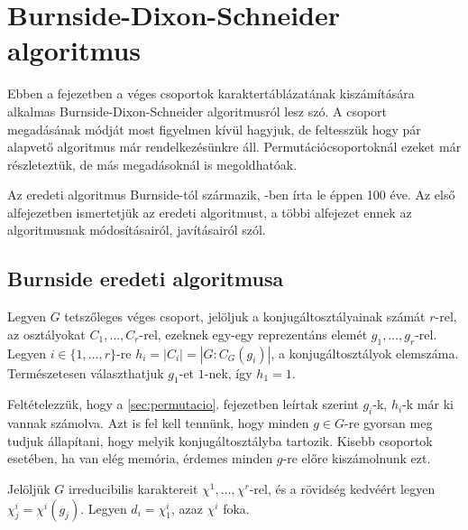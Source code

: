 \section{Burnside-Dixon-Schneider algoritmus}
\label{sec:burnside}
Ebben a fejezetben a véges csoportok karaktertáblázatának kiszámítására alkalmas Burnside-Dixon-Schneider algoritmusról lesz szó.
A csoport megadásának módját most figyelmen kívül hagyjuk, de feltesszük hogy pár alapvető algoritmus már rendelkezésünkre áll.
Permutációcsoportoknál ezeket már részleteztük, de más megadásoknál is megoldhatóak.

Az eredeti algoritmus Burnside-tól származik, \cite{Bur11}-ben írta le éppen 100 éve.
Az első alfejezetben ismertetjük az eredeti algoritmust, a többi alfejezet ennek az algoritmusnak módosításairól, javításairól szól.

\subsection{Burnside eredeti algoritmusa}
\label{subsec:bdseredeti}
Legyen $G$ tetszőleges véges csoport, jelöljuk a konjugáltosztályainak számát $r$-rel, az osztályokat $C_1, \dots, C_r$-rel, ezeknek egy-egy reprezentáns elemét $g_1, \dots, g_r$-rel.
Legyen $i \in \{1, \dots, r\}$-re $h_i=|C_i|=|G:C_G(g_i)|$, a konjugáltosztályok elemszáma.
Természetesen választhatjuk $g_1$-et $1$-nek, így $h_1=1$.

Feltételezzük, hogy a \ref{sec:permutacio}. fejezetben leírtak szerint $g_i$-k, $h_i$-k már ki vannak számolva.
Azt is fel kell tennünk, hogy minden $g\in G$-re gyorsan meg tudjuk állapítani, hogy melyik konjugáltosztályba tartozik.
Kisebb csoportok esetében, ha van elég memória, érdemes minden $g$-re előre kiszámolnunk ezt.

Jelöljük $G$ irreducibilis karaktereit $\chi^1, \dots, \chi^r$-rel, és a rövidség kedvéért legyen $\chi^i_j=\chi^i(g_j)$.
Legyen $d_i=\chi^i_1$, azaz $\chi^i$ foka.

